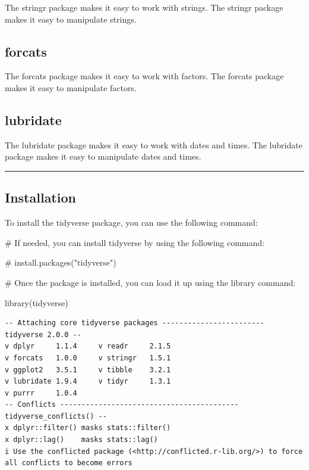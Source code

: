 \documentclass[
  letterpaper,
  DIV=11,
  numbers=noendperiod]{scrreprt}
\newenvironment{Shaded}{\begin{snugshade}}{\end{snugshade}}
\newcommand{\CommentTok}[1]{\textcolor[rgb]{0.37,0.37,0.37}{#1}}
\newcommand{\FunctionTok}[1]{\textcolor[rgb]{0.28,0.35,0.67}{#1}}
\newcommand{\NormalTok}[1]{\textcolor[rgb]{0.00,0.23,0.31}{#1}}
\begin{document}
The stringr package makes it easy to work with strings. The stringr
package makes it easy to manipulate strings.

\subsection*{forcats}\label{forcats}

The forcats package makes it easy to work with factors. The forcats
package makes it easy to manipulate factors.

\subsection*{lubridate}\label{lubridate}

The lubridate package makes it easy to work with dates and times. The
lubridate package makes it easy to manipulate dates and times.

\begin{center}\rule{0.5\linewidth}{0.5pt}\end{center}

\subsection*{Installation}\label{installation}

To install the tidyverse package, you can use the following command:

\begin{Shaded}
\begin{Highlighting}[]
\CommentTok{\# If needed, you can install tidyverse by using the following command:}

\CommentTok{\# install.packages("tidyverse")}

\CommentTok{\# Once the package is installed, you can load it up using the library command:}

\FunctionTok{library}\NormalTok{(tidyverse)}
\end{Highlighting}
\end{Shaded}

\begin{verbatim}
-- Attaching core tidyverse packages ------------------------ tidyverse 2.0.0 --
v dplyr     1.1.4     v readr     2.1.5
v forcats   1.0.0     v stringr   1.5.1
v ggplot2   3.5.1     v tibble    3.2.1
v lubridate 1.9.4     v tidyr     1.3.1
v purrr     1.0.4     
-- Conflicts ------------------------------------------ tidyverse_conflicts() --
x dplyr::filter() masks stats::filter()
x dplyr::lag()    masks stats::lag()
i Use the conflicted package (<http://conflicted.r-lib.org/>) to force all conflicts to become errors
\end{verbatim}
\end{document}
